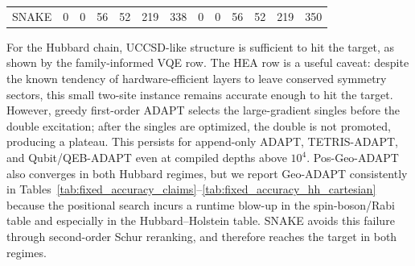 \documentclass[
  reprint,
  amsmath,
  amssymb,
  aps,
  pra,
  nofootinbib,
  superscriptaddress,
  floatfix
]{revtex4-2}
\begin{document}
\begin{widetext}
\begin{minipage}{\textwidth}
\begin{center}
\begin{ruledtabular}
\begin{tabular}{p{}cccccc|cccccc}
SNAKE & 0 & 0 & 56 & 52 & 219 & 338 & 0 & 0 & 56 & 52 & 219 & 350\\
\end{tabular}
\end{ruledtabular}
\end{center}
\end{minipage}
\par\addvspace{1.0ex}
For the Hubbard chain, UCCSD-like structure is sufficient to hit the target, as shown by the family-informed VQE row. The HEA row is a useful caveat: despite the known tendency of hardware-efficient layers to leave conserved symmetry sectors, this small two-site instance remains accurate enough to hit the target. However, greedy first-order ADAPT selects the large-gradient singles before the double excitation; after the singles are optimized, the double is not promoted, producing a plateau. This persists for append-only ADAPT, TETRIS-ADAPT, and Qubit/QEB-ADAPT even at compiled depths above \(10^4\). Pos-Geo-ADAPT also converges in both Hubbard regimes, but we report Geo-ADAPT consistently in Tables~\ref{tab:fixed_accuracy_claims}--\ref{tab:fixed_accuracy_hh_cartesian} because the positional search incurs a runtime blow-up in the spin-boson/Rabi table and especially in the Hubbard--Holstein table. SNAKE avoids this failure through second-order Schur reranking, and therefore reaches the target in both regimes.


\end{widetext}
\end{document}
